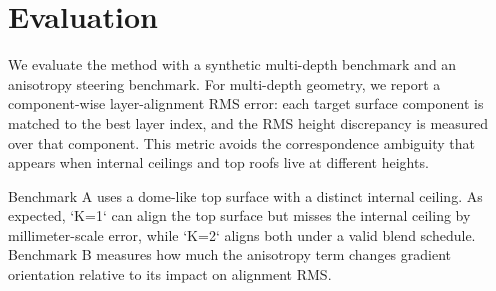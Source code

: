 \section{Evaluation}

We evaluate the method with a synthetic multi-depth benchmark and an anisotropy steering benchmark. For multi-depth geometry, we report a component-wise layer-alignment RMS error: each target surface component is matched to the best layer index, and the RMS height discrepancy is measured over that component. This metric avoids the correspondence ambiguity that appears when internal ceilings and top roofs live at different heights.

Benchmark A uses a dome-like top surface with a distinct internal ceiling. As expected, `K=1` can align the top surface but misses the internal ceiling by millimeter-scale error, while `K=2` aligns both under a valid blend schedule. Benchmark B measures how much the anisotropy term changes gradient orientation relative to its impact on alignment RMS.
